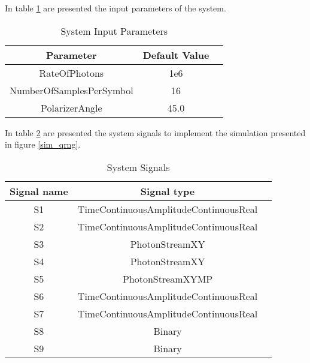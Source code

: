 \begin{refsection}
In table \ref{tb:inputparameters2} are presented the input parameters of the system.


\begin{table}[H]
\centering
\caption{System Input Parameters}
\label{tb:inputparameters2}
\begin{tabular}{|c|c|c|}
\hline
\textbf{Parameter}                      & \textbf{Default Value}                                       \\ \hline
RateOfPhotons                           & 1e6                                                          \\ \hline
NumberOfSamplesPerSymbol                & 16                                                           \\ \hline
PolarizerAngle                          & 45.0                                                         \\ \hline

\end{tabular}
\end{table}

In table \ref{tb:signals2} are presented the system signals to implement the simulation presented in figure \ref{sim_qrng}.
\begin{table}[H]
\centering
\caption{System Signals}
\label{tb:signals2}
\begin{tabular}{|c|c|c|}
\hline
\textbf{Signal name}                            & \textbf{Signal type}                      \\ \hline
S1                                              &  TimeContinuousAmplitudeContinuousReal    \\ \hline
S2                                              &  TimeContinuousAmplitudeContinuousReal    \\ \hline
S3                                              &  PhotonStreamXY                           \\ \hline
S4                                              &  PhotonStreamXY                           \\ \hline
S5                                              &  PhotonStreamXYMP                         \\ \hline
S6                                              &  TimeContinuousAmplitudeContinuousReal    \\ \hline
S7                                              &  TimeContinuousAmplitudeContinuousReal    \\ \hline
S8                                              &  Binary                                   \\ \hline
S9                                              &  Binary                                   \\ \hline
\end{tabular}
\end{table}


\end{refsection}
